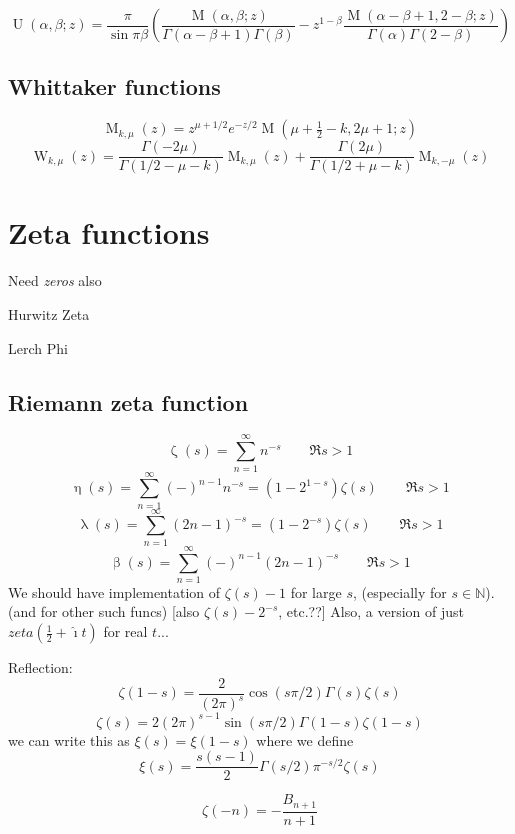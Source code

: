 \documentclass[10pt,dvipdfmx,letterpaper,twoside]{article}
\let\O=\operatorname
\newcommand{\NN}{{\mathbb{N}}}
\newcommand{\ii}{{\hat{\imath}}}
\let\al=\alpha
\let\Gam=\Gamma
\begin{document}
\[ \O{U}(\al, \beta; z) = \frac{\pi}{\sin \pi\beta}\left( \frac{\O{M}(\al, \beta; z)}{\Gam(\al-\beta+1)\Gam(\beta)}
  - z^{1-\beta}\frac{\O{M}(\al-\beta+1, 2-\beta; z)}{\Gam(\al) \Gam(2-\beta)} \right) \]

\subsection{Whittaker functions}
\[ \O{M}_{k,\mu}(z) = z^{\mu+1/2}e^{-z/2} \O{M}(\mu+\tfrac12-k, 2\mu+1; z) \]
\[ \O{W}_{k,\mu}(z) = \frac{\Gam(-2\mu)}{\Gam(1/2 - \mu - k)}\O{M}_{k,\mu}(z) + \frac{\Gam(2\mu)}{\Gam(1/2 + \mu - k)}\O{M}_{k,-\mu}(z) \]

\section{Zeta functions}
Need {\em zeros} also

Hurwitz Zeta

Lerch Phi

\subsection{Riemann zeta function}
\[ \O{\zeta}(s) = \sum_{n=1}^\infty n^{-s} \qquad \Re s>1 \]
\[ \O{\eta}(s) =  \sum_{n=1}^\infty (-)^{n-1}n^{-s} = (1-2^{1-s})\zeta(s) \qquad \Re s>1 \]
\[ \O{\lambda}(s) =  \sum_{n=1}^\infty (2n-1)^{-s} = (1-2^{-s})\zeta(s) \qquad \Re s>1 \]
\[ \O{\beta}(s) =  \sum_{n=1}^\infty (-)^{n-1}(2n-1)^{-s} \qquad \Re s>1 \]
We should have implementation of $\zeta(s)-1$ for large $s$, (especially for $s\in\NN$).
(and for other such funcs) [also $\zeta(s)-2^{-s}$, etc.??]
Also, a version of just $zeta(\tfrac12 + \ii t)$ for real $t$...

Reflection:
\[ \zeta(1-s) = \frac{2}{(2\pi)^s}\cos(s\pi/2)\Gam(s)\zeta(s) \]
\[ \zeta(s) = 2(2\pi)^{s-1}\sin(s\pi/2)\Gam(1-s)\zeta(1-s) \]
we can write this as $\xi(s) = \xi(1-s)$ where we define
\[ \xi(s) = \frac{s(s-1)}{2}\Gam(s/2)\pi^{-s/2}\zeta(s) \]

\[ \zeta(-n) = -\frac{B_{n+1}}{n+1} \]
\end{document}
